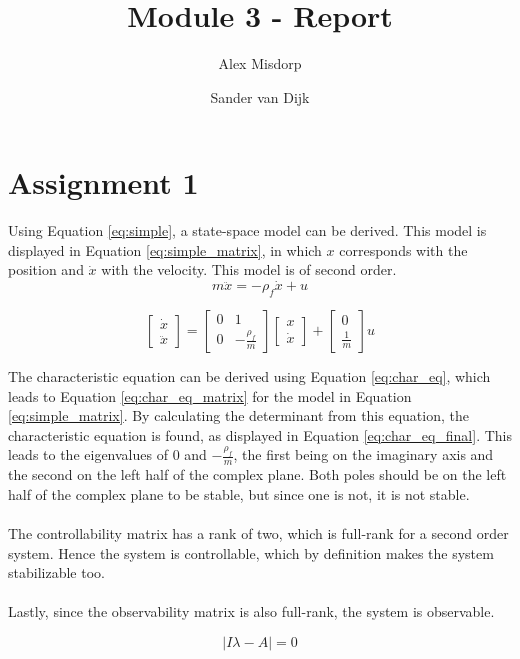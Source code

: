 \documentclass[final]{scrreprt} %
\title{Module 3 - Report}
\author{Alex {Misdorp} \and Sander {van Dijk}}
\begin{document}
\chapter{Assignment 1}
Using Equation \ref{eq:simple}, a state-space model can be derived. This model is displayed in Equation \ref{eq:simple_matrix}, in which $x$ corresponds with the position and $\dot{x}$ with the velocity. This model is of second order.
\begin{equation}
	m \ddot{x} = -\rho_f \dot{x} + u
	\label{eq:simple}
\end{equation}

\begin{equation}
	\begin{bmatrix}
		\dot{x} \\
		\ddot{x}
	\end{bmatrix} =
	\begin{bmatrix}
		0 & 1 \\
		0 & -\frac{\rho_f}{m}
	\end{bmatrix}
	\begin{bmatrix}
		x \\
		\dot{x}
	\end{bmatrix} +
	\begin{bmatrix}
		0 \\
		\frac{1}{m}
	\end{bmatrix}
	u
	\label{eq:simple_matrix}
\end{equation}

The characteristic equation can be derived using Equation \ref{eq:char_eq}, which leads to Equation \ref{eq:char_eq_matrix} for the model in Equation \ref{eq:simple_matrix}. By calculating the determinant from this equation, the characteristic equation is found, as displayed in Equation \ref{eq:char_eq_final}. This leads to the eigenvalues of $0$ and $-\frac{\rho_f}{m}$, the first being on the imaginary axis and the second on the left half of the complex plane. Both poles should be on the left half of the complex plane to be stable, but since one is not, it is not stable.
\\ \\
The controllability matrix has a rank of two, which is full-rank for a second order system. Hence the system is controllable, which by definition makes the system stabilizable too.
\\ \\
Lastly, since the observability matrix is also full-rank, the system is observable.

\begin{equation}
	\left| I \lambda - A \right| = 0
	\label{eq:char_eq}
\end{equation}
\end{document}

